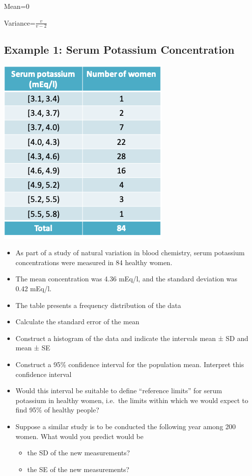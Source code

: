 \documentclass[
]{book}
\providecommand{\tightlist}{%
  \setlength{\itemsep}{0pt}\setlength{\parskip}{0pt}}
\begin{document}
Mean=0

Variance=\(\frac{v}{v-2}\)

\hypertarget{example-1-serum-potassium-concentration}{%
\subsection{Example 1: Serum Potassium Concentration}\label{example-1-serum-potassium-concentration}}

\includegraphics[width=0.5\linewidth]{./3_42}

\begin{itemize}
\tightlist
\item
  As part of a study of natural variation in blood chemistry, serum potassium concentrations were measured in 84 healthy women.
\item
  The mean concentration was 4.36 mEq/l, and the standard deviation was 0.42 mEq/l.
\item
  The table presents a frequency distribution of the data
\item
  Calculate the standard error of the mean
\item
  Construct a histogram of the data and indicate the intervals mean ± SD and mean ± SE
\item
  Construct a 95\% confidence interval for the population mean. Interpret this confidence interval
\item
  Would this interval be suitable to define ``reference limits'' for serum potassium in healthy women, i.e.~the limits within which we would expect to find 95\% of healthy people?
\item
  Suppose a similar study is to be conducted the following year among 200 women. What would you predict would be

  \begin{itemize}
  \tightlist
  \item
    the SD of the new measurements?
  \item
    the SE of the new measurements?
  \end{itemize}
\end{itemize}
\end{document}
